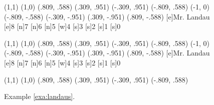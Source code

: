 \begin{figure}[ht]
\begin{minipage}{.3\textwidth}
\centering
\begin{graph}(1,1)
(1,0)
(.809, .588) %
(.309, .951) %
(-.309, .951) %
(-.809, .588) %
(-1, 0) %
(-.809, -.588) %
(-.309, -.951) %
(.309, -.951) %
(.809, -.588) %
[e]{Mr. Landau} [e]{8}
[n]{7} [n]{6}
[n]{5} [w]{4}
[s]{3} [s]{2}
[s]{1} [s]{0} 
    
 
\end{graph}\vspace*{.5in}\caption{Example
\ref{exa:landaus}.} \label{fig:landaus1}
\end{minipage}
\hfill
\begin{minipage}{.3\textwidth}
\centering
\begin{graph}(1,1)
(1,0)
(.809, .588) %
(.309, .951) %
(-.309, .951) %
(-.809, .588) %
(-1, 0) %
(-.809, -.588) %
(-.309, -.951) %
(.309, -.951) %
(.809, -.588) %
[e]{Mr. Landau} [e]{8}
[n]{7} [n]{6}
[n]{5} [w]{4}
[s]{3} [s]{2}
[s]{1} [s]{0} 
    
    
\end{graph}\vspace*{.5in}\caption{Example
\ref{exa:landaus}.} \label{fig:landaus2}
\end{minipage}
\hfill
\begin{minipage}{.3\textwidth}
\centering
\begin{graph}(1,1)
(1,0)
(.809, .588) %
(.309, .951) %
(-.309, .951) %
(-.809, .588) %

\end{graph}
\end{minipage}
\end{figure}
